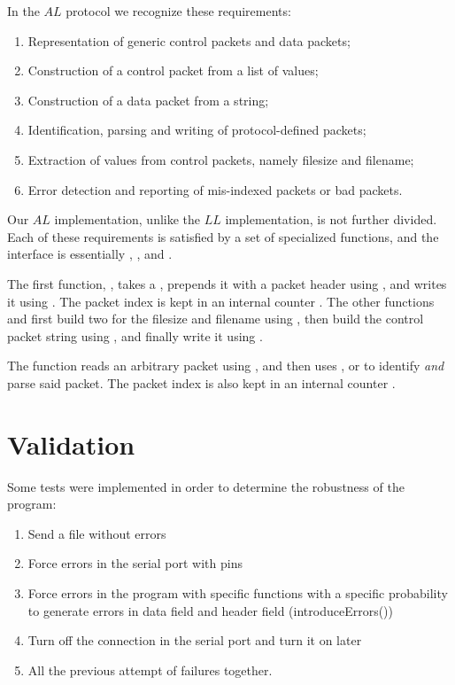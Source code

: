 \documentclass[main.tex]{subfiles}
\begin{document}
In the $AL$ protocol we recognize these requirements:

\begin{enumerate}[label=(\alph*),noitemsep,rightmargin=3em]
	\item Representation of generic control packets and data packets;
	\item Construction of a control packet from a list of values;
	\item Construction of a data packet from a string;
	\item Identification, parsing and writing of protocol-defined packets;
	\item Extraction of  values from control packets, namely filesize and filename;
	\item Error detection and reporting of mis-indexed \pDATA{} packets or bad packets.
\end{enumerate}

Our $AL$ implementation, unlike the $LL$ implementation, is not further divided. Each of these requirements is satisfied by a set of specialized functions, and the interface is essentially , ,  and .

The first function, , takes a , prepends it with a packet header using , and writes it using . The packet index is kept in an internal counter . The other functions  and  first build two  for the filesize and filename using , then build the control packet string using , and finally write it using .

The  function reads an arbitrary packet using , and then uses ,  or  to identify \emph{and} parse said packet. The packet index is also kept in an internal counter .

\section{Validation}
\label{sec:validation}

Some tests were implemented in order to determine the robustness of the program:
\begin{enumerate}[label=(\alph*),noitemsep,rightmargin=3em]
	\item Send a file without errors
	\item Force errors in the serial port with pins
	\item Force errors in the program with specific functions with a specific probability to generate errors in data field and header field (introduceErrors())
	\item Turn off the connection in the serial port and turn it on later
	\item All the previous attempt of failures together.
\end{enumerate}
\end{document}
